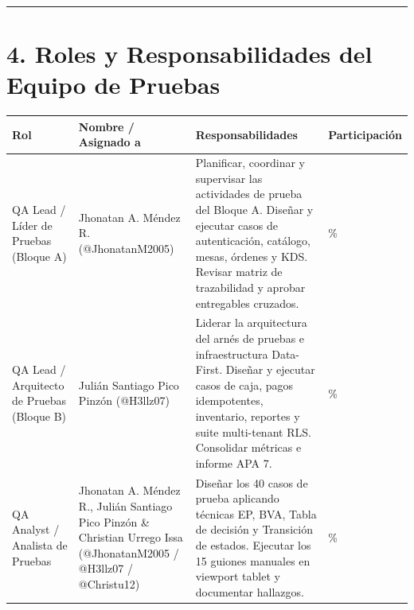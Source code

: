 \documentclass[10pt,a4paper]{article}
\newcounter{none}
\begin{document}
\begin{center}\rule{0.5\linewidth}{0.5pt}\end{center}


\section{4. Roles y Responsabilidades del Equipo de Pruebas}\label{4-roles-y-responsabilidades-del-equipo-de-pruebas}

\begingroup\singlespacing\footnotesize\setlength{\parskip}{0pt}

{\def\LTcaptype{none} %
\begin{longtable}[]{@{}
  >{\raggedright\arraybackslash}p{}
  >{\raggedright\arraybackslash}p{}
  >{\raggedright\arraybackslash}p{}
  >{\raggedright\arraybackslash}p{}@{}}
\toprule\noalign{}
\begin{minipage}[b]{\linewidth}\raggedright
Rol
\end{minipage} & \begin{minipage}[b]{\linewidth}\raggedright
Nombre / Asignado a
\end{minipage} & \begin{minipage}[b]{\linewidth}\raggedright
Responsabilidades
\end{minipage} & \begin{minipage}[b]{\linewidth}\raggedright
Participación
\end{minipage} \\
\midrule\noalign{}
\endhead
\bottomrule\noalign{}
\endlastfoot
QA Lead / Líder de Pruebas (Bloque A) & Jhonatan A. Méndez R. (@JhonatanM2005) & Planificar, coordinar y supervisar las actividades de prueba del Bloque A. Diseñar y ejecutar casos de autenticación, catálogo, mesas, órdenes y KDS. Revisar matriz de trazabilidad y aprobar entregables cruzados. & 100\% \\
QA Lead / Arquitecto de Pruebas (Bloque B) & Julián Santiago Pico Pinzón (@H3llz07) & Liderar la arquitectura del arnés de pruebas e infraestructura Data-First. Diseñar y ejecutar casos de caja, pagos idempotentes, inventario, reportes y suite multi-tenant RLS. Consolidar métricas e informe APA 7. & 100\% \\
QA Analyst / Analista de Pruebas & Jhonatan A. Méndez R., Julián Santiago Pico Pinzón \& Christian Urrego Issa (@JhonatanM2005 / @H3llz07 / @Christu12) & Diseñar los 40 casos de prueba aplicando técnicas EP, BVA, Tabla de decisión y Transición de estados. Ejecutar los 15 guiones manuales en viewport tablet y documentar hallazgos. & 100\% \\

\end{longtable}}
\end{document}
